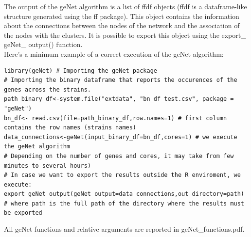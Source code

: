 \documentclass{article}
\begin{document}
The output of the geNet algorithm is a list of ffdf objects (ffdf is a dataframe-like structure generated using the ff package). This object contains the information about the connections between the nodes of the network and the association of the nodes with the clusters. It is possible to export this object using the export\_ geNet\_ output() function.\\
Here's a minimum example of a correct execution of the geNet algorithm:
\begin{framed}
\begin{lstlisting}
library(geNet) # Importing the geNet package
# Importing the binary dataframe that reports the occurences of the genes across the strains.
path_binary_df<-system.file("extdata", "bn_df_test.csv", package = "geNet")
bn_df<- read.csv(file=path_binary_df,row.names=1) # first column contains the row names (strains names)
data_connections<-geNet(input_binary_df=bn_df,cores=1) # we execute the geNet algorithm
# Depending on the number of genes and cores, it may take from few minutes to several hours)
# In case we want to export the results outside the R enviroment, we execute:
export_geNet_output(geNet_output=data_connections,out_directory=path)
# where path is the full path of the directory where the results must be exported
\end{lstlisting}
\end{framed}

All geNet functions and relative arguments are reported in geNet\_functions.pdf.\\


\newpage
\end{document}
